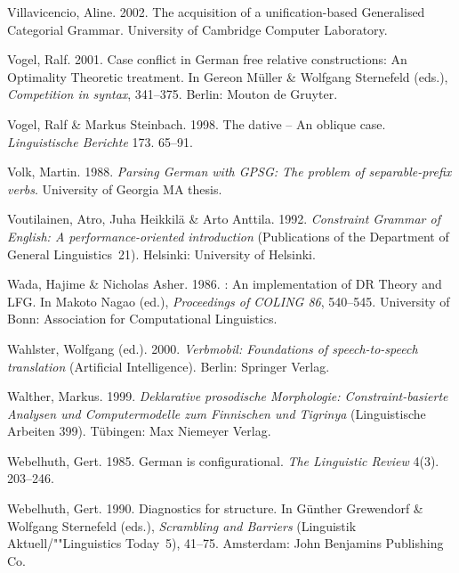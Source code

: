 \begin{thebibliography}{1420}
Villavicencio, Aline. 2002.
\newblock The acquisition of a unification-based {Generalised Categorial
  Grammar}.
 University of Cambridge Computer Laboratory.

Vogel, Ralf. 2001.
\newblock Case conflict in {German} free relative constructions: {An}
  {Optimality Theoretic} treatment.
\newblock In Gereon M{\"u}ller \& Wolfgang Sternefeld (eds.), \emph{Competition
  in syntax}, 341--375. Berlin: Mouton de Gruyter.

Vogel, Ralf \& Markus Steinbach. 1998.
\newblock The dative -- {An} oblique case.
\newblock \emph{Linguistische Berichte} 173. 65--91.

Volk, Martin. 1988.
\newblock \emph{Parsing {German} with {GPSG}: {The} problem of separable-prefix
  verbs}.
\newblock University of Georgia MA thesis.

Voutilainen, Atro, Juha Heikkil{\"a} \& Arto Anttila. 1992.
\newblock \emph{{Constraint Grammar} of {English}: {A} performance-oriented
  introduction} (Publications of the Department of General Linguistics~21).
\newblock Helsinki: University of Helsinki.

Wada, Hajime \& Nicholas Asher. 1986.
: {An} implementation of {DR Theory} and {LFG}.
\newblock In Makoto Nagao (ed.), \emph{Proceedings of {COLING} 86}, 540--545.
  University of Bonn: Association for Computational Linguistics.

Wahlster, Wolfgang (ed.). 2000.
\newblock \emph{Verbmobil: {Foundations} of speech-to-speech translation}
  (Artificial Intelligence).
\newblock Berlin: Springer Verlag.

Walther, Markus. 1999.
\newblock \emph{{Deklarative prosodische Morphologie: Constraint-basierte
  Analysen und Computermodelle zum Finnischen und Tigrinya}} (Linguistische
  Arbeiten 399).
\newblock T{\"u}bingen: Max Niemeyer Verlag.

Webelhuth, Gert. 1985.
\newblock German is configurational.
\newblock \emph{The Linguistic Review} 4(3). 203--246.

Webelhuth, Gert. 1990.
\newblock Diagnostics for structure.
\newblock In G{\"u}nther Grewendorf \& Wolfgang Sternefeld (eds.),
  \emph{{Scrambling and Barriers}} (Linguistik Aktuell/""Linguistics Today~5),
  41--75. Amsterdam: John Benjamins Publishing Co.


\end{thebibliography}
